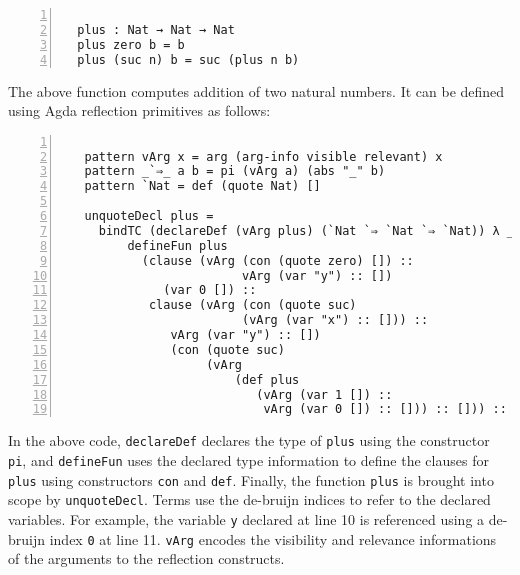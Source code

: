 \documentclass[sigplan,10pt]{acmart}
\begin{document}
\begin{center}
\begingroup
\fontsize{7pt}{9pt}\selectfont
\begin{Verbatim}[frame = lines, rulecolor=\color{blue}, numbers = left, numbersep = 0pt]

  plus : Nat → Nat → Nat
  plus zero b = b
  plus (suc n) b = suc (plus n b)

\end{Verbatim}
\endgroup
\end{center}

\normalsize

The above function computes addition of two natural numbers. It can be defined using Agda reflection primitives as follows: 

\begin{center}
\begingroup
\fontsize{7pt}{9pt}\selectfont
\begin{Verbatim}[frame = lines, rulecolor=\color{blue}, numbers = left, numbersep = 0pt]

   pattern vArg x = arg (arg-info visible relevant) x
   pattern _`⇒_ a b = pi (vArg a) (abs "_" b)
   pattern `Nat = def (quote Nat) []

   unquoteDecl plus =
     bindTC (declareDef (vArg plus) (`Nat `⇒ `Nat `⇒ `Nat)) λ _ → 
         defineFun plus
           (clause (vArg (con (quote zero) []) ::
                         vArg (var "y") :: [])
              (var 0 []) ::
            clause (vArg (con (quote suc)
                         (vArg (var "x") :: [])) ::
               vArg (var "y") :: [])
               (con (quote suc)
                    (vArg
                        (def plus
                           (vArg (var 1 []) ::
                            vArg (var 0 []) :: [])) :: [])) :: [])

\end{Verbatim}
\endgroup
\end{center}

\normalsize

In the above code, {\tt declareDef} declares the type of {\tt plus} using the constructor {\tt pi}, and {\tt defineFun} uses the declared type information to define the clauses for {\tt plus} using constructors {\tt con} and {\tt def}. Finally, the function {\tt plus} is brought into scope by {\tt unquoteDecl}. Terms use the de-bruijn indices to refer to the declared variables. For example, the variable {\tt y} declared at line 10 is referenced using a de-bruijn index {\tt 0} at line 11. {\tt vArg} encodes the visibility and relevance informations of the arguments to the reflection constructs.
\end{document}
